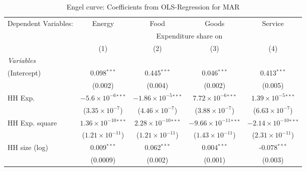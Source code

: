 
\begin{table}[htbp!]
   \centering
   \small
   \begin{adjustbox}{width = 1\textwidth, max height = 0.95\textheight, center}
      \begin{threeparttable}[b]
         \caption{\label{tab:Engel_parametric_MAR} Engel curve: Coefficients from OLS-Regression for MAR}
         \begin{tabular}{lcccc}
            \tabularnewline \midrule \midrule
            Dependent Variables: & Energy                         & Food                           & Goods                           & Service\\  
             & \multicolumn{4}{c}{Expenditure share on} \\ 
                                 & (1)                            & (2)                            & (3)                             & (4)\\  
            \midrule
            \emph{Variables}\\
            (Intercept)          & 0.098$^{***}$                  & 0.445$^{***}$                  & 0.046$^{***}$                   & 0.413$^{***}$\\   
                                 & (0.002)                        & (0.004)                        & (0.002)                         & (0.005)\\   
            HH Exp.              & $-5.6\times 10^{-6}$$^{***}$   & $-1.86\times 10^{-5}$$^{***}$  & $7.72\times 10^{-6}$$^{***}$    & $1.39\times 10^{-5}$$^{***}$\\    
                                 & ($3.35\times 10^{-7}$)         & ($4.46\times 10^{-7}$)         & ($3.88\times 10^{-7}$)          & ($6.63\times 10^{-7}$)\\    
            HH Exp. square       & $1.36\times 10^{-10}$$^{***}$  & $2.28\times 10^{-10}$$^{***}$  & $-9.66\times 10^{-11}$$^{***}$  & $-2.14\times 10^{-10}$$^{***}$\\    
                                 & ($1.21\times 10^{-11}$)        & ($1.21\times 10^{-11}$)        & ($1.43\times 10^{-11}$)         & ($2.31\times 10^{-11}$)\\    
            HH size (log)        & 0.009$^{***}$                  & 0.062$^{***}$                  & 0.004$^{***}$                   & -0.078$^{***}$\\   
                                 & (0.0009)                       & (0.002)                        & (0.001)                         & (0.003)\\   

\end{tabular}
\end{threeparttable}
\end{adjustbox}
\end{table}
